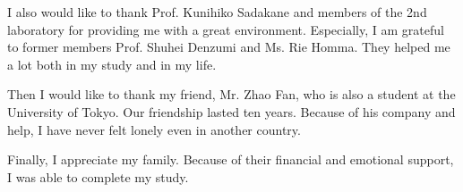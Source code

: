 \documentclass[suri,pdfbookmark]{engsuribt} %
\begin{document}
  I also would like to thank Prof. Kunihiko Sadakane and members of the 2nd laboratory for providing me with a great environment. Especially, I am grateful to former members Prof. Shuhei Denzumi and Ms. Rie Homma. They helped me a lot both in my study and in my life.

  Then I would like to thank my friend, Mr. Zhao Fan, who is also a student at the University of Tokyo. Our friendship lasted ten years. Because of his company and help, I have never felt lonely even in another country.

  Finally, I appreciate my family. Because of their financial and emotional support, I was able to complete my study.


\printbibliography[heading=bibintoc]

\appendix
\end{document}
